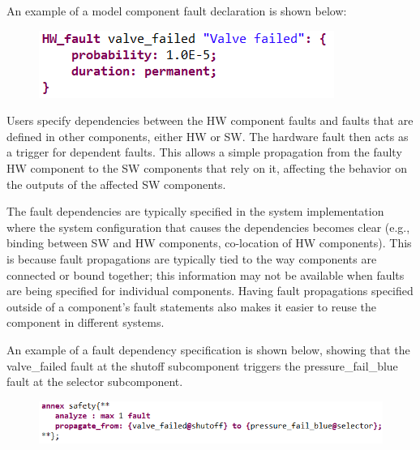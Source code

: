 An example of a model component fault declaration is shown below:
\begin{figure}[h!]
	\vspace{-0.2in}
	\begin{center}
		\includegraphics[width=.5\textwidth]{images/hw_fault.png}
	\end{center}
	\vspace{-0.4in}
\end{figure}

Users specify dependencies between the HW component faults and faults that are defined in other components, either HW or SW. The hardware fault then acts as a trigger for dependent faults. This allows a simple propagation from the faulty HW component to the SW components that rely on it, affecting the behavior on the outputs of the affected SW components.

The fault dependencies are typically specified in the system implementation where the system configuration that causes the dependencies becomes clear (e.g., binding between SW and HW components, co-location of HW components). This is because fault propagations are typically tied to the way components are connected or bound together; this information may not be available when faults are being specified for individual components. Having fault propagations specified outside of a component’s fault statements also makes it easier to reuse the component in different systems. 

An example of a fault dependency specification is shown below, showing that the valve{\_}failed fault at the shutoff subcomponent triggers the pressure{\_}fail{\_}blue fault at the selector subcomponent.
\begin{figure}[h!]
	\vspace{-0.2in}
	\begin{center}
		\includegraphics[width=.9\textwidth]{images/fault_propagation.png}
	\end{center}
	\vspace{-0.4in}
\end{figure}


